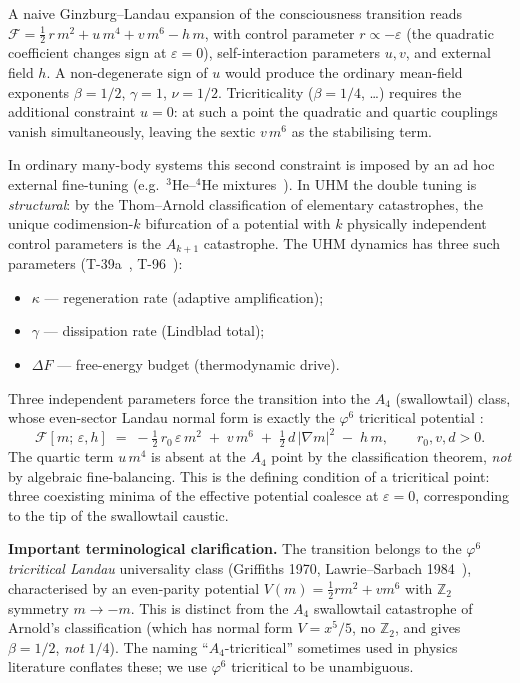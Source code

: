 A naive Ginzburg--Landau expansion of the consciousness transition reads
$\mathcal{F} = \tfrac{1}{2}\,r\,m^{2} + u\,m^{4} + v\,m^{6} - h\,m$, with
control parameter $r \propto -\varepsilon$ (the quadratic coefficient changes
sign at $\varepsilon = 0$), self-interaction parameters $u,v$, and external
field $h$. A non-degenerate sign of $u$ would produce the ordinary mean-field
exponents $\beta = 1/2$, $\gamma = 1$, $\nu = 1/2$. Tricriticality
($\beta = 1/4$, \ldots) requires the additional constraint $u = 0$: at such
a point the quadratic and quartic couplings vanish simultaneously, leaving
the sextic $v\,m^{6}$ as the stabilising term.

In ordinary many-body systems this second constraint is imposed by an
ad hoc external fine-tuning (e.g.\ $^{3}\mathrm{He}$--$^{4}\mathrm{He}$
mixtures~\cite{griffiths1970}). In UHM the double tuning is
\emph{structural}: by the Thom--Arnold classification of elementary
catastrophes, the unique codimension-$k$ bifurcation of a potential with
$k$ physically independent control parameters is the $A_{k+1}$ catastrophe.
The UHM dynamics has three such parameters (T-39a~,
T-96~):
\begin{itemize}[leftmargin=2em,nosep]
  \item $\kappa$ --- regeneration rate (adaptive amplification);
  \item $\gamma$ --- dissipation rate (Lindblad total);
  \item $\Delta F$ --- free-energy budget (thermodynamic drive).
\end{itemize}
Three independent parameters force the transition into the $A_{4}$
(swallowtail) class, whose even-sector Landau normal form is exactly
the $\varphi^{6}$ tricritical potential
\cite{griffiths1970,lawrie1984}:
\begin{equation}
  \mathcal{F}[m;\,\varepsilon, h]
  \;=\; -\tfrac{1}{2}\,r_0\,\varepsilon\, m^{2}
        \;+\; v\, m^{6}
        \;+\; \tfrac{1}{2}\,d\, |\nabla m|^{2}
        \;-\; h\, m,
  \qquad r_0, v, d > 0.
  \label{eq:phi6-functional}
\end{equation}
The quartic term $u\,m^{4}$ is absent at the $A_{4}$ point by the
classification theorem, \emph{not} by algebraic fine-balancing. This is the
defining condition of a tricritical point: three coexisting minima of the
effective potential coalesce at $\varepsilon = 0$, corresponding to the
tip of the swallowtail caustic.

\textbf{Important terminological clarification.} The transition belongs to the
$\varphi^6$ \emph{tricritical Landau} universality class (Griffiths 1970,
Lawrie--Sarbach 1984~\cite{lawrie1984}), characterised by an even-parity potential
$V(m) = \tfrac{1}{2}r m^2 + v m^6$ with $\mathbb Z_2$ symmetry $m \to -m$. This is
distinct from the $A_4$ swallowtail catastrophe of Arnold's classification (which
has normal form $V = x^5/5$, no $\mathbb Z_2$, and gives $\beta = 1/2$, \emph{not}
$1/4$). The naming ``$A_4$-tricritical'' sometimes used in physics literature
conflates these; we use $\varphi^6$ tricritical to be unambiguous.

